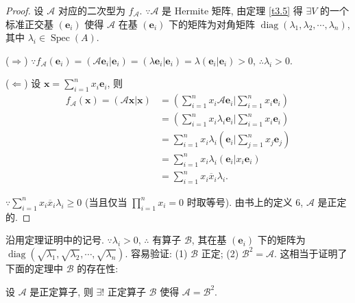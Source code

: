 \documentclass{ctexart}
\begin{document}
\begin{proof}
    设 $\mathcal{A}$ 对应的二次型为 $f_\mathcal{A}$. $\because\mathcal{A}$ 是 Hermite 矩阵, 由定理 \ref{t3.5} 得 $\exists V$ 的一个标准正交基 $(\boldsymbol{e}_i)$ 使得 $\mathcal{A}$ 在基 $(\boldsymbol{e}_i)$ 下的矩阵为对角矩阵 $\operatorname{diag}(\lambda_1,\lambda_2,\cdots,\lambda_n)$, 其中 $\lambda_i\in\operatorname{Spec}(A)$.

    ($\Rightarrow$) $\because f_\mathcal{A}(\boldsymbol{e}_i)=(\mathcal{A}\boldsymbol{e}_i|\boldsymbol{e}_i)=(\lambda\boldsymbol{e}_i|\boldsymbol{e}_i)=\lambda(\boldsymbol{e}_i|\boldsymbol{e}_i)>0$, $\therefore\lambda_i>0$.

    ($\Leftarrow$) 设 $\boldsymbol{x}=\sum\limits_{i=1}^nx_i\boldsymbol{e}_i$, 则
    \begin{align*}
        f_\mathcal{A}(\boldsymbol{x})=(\mathcal{A}\boldsymbol{x}|\boldsymbol{x}) & =\left(\sum\limits_{i=1}^nx_i\mathcal{A}\boldsymbol{e}_i\Bigg|\sum\limits_{i=1}^nx_i\boldsymbol{e}_i\right) \\
        & =\left(\sum\limits_{i=1}^nx_i\lambda_i\boldsymbol{e}_i\Bigg|\sum\limits_{i=1}^nx_i\boldsymbol{e}_i\right) \\
        & =\sum\limits_{i=1}^nx_i\lambda_i\left(\boldsymbol{e}_i\Bigg|\sum\limits_{j=1}^nx_j\boldsymbol{e}_j\right) \\
        & =\sum\limits_{i=1}^nx_i\lambda_i\left(\boldsymbol{e}_i|x_i\boldsymbol{e}_i\right) \\
        & =\sum\limits_{i=1}^nx_i\overline{x}_i\lambda_i.
    \end{align*}

    $\because\sum\limits_{i=1}^nx_i\overline{x}_i\lambda_i\geq0$ (当且仅当 $\prod\limits_{i=1}^nx_i=0$ 时取等号). 由书上的定义 6, $\mathcal{A}$ 是正定的.
\end{proof}
沿用定理证明中的记号. $\because\lambda_i>0$, $\therefore$ 有算子 $\mathcal{B}$, 其在基 $(\boldsymbol{e}_i)$ 下的矩阵为 $\operatorname{diag}(\sqrt{\lambda_1},\sqrt{\lambda_2},\cdots,\sqrt{\lambda_n})$. 容易验证: (1) $\mathcal{B}$ 正定; (2) $\mathcal{B}^2=\mathcal{A}$. 这相当于证明了下面的定理中 $\mathcal{B}$ 的存在性:
\begin{theorem}[书上的命题 1]
    设 $\mathcal{A}$ 是正定算子, 则 $\exists!$ 正定算子 $\mathcal{B}$ 使得 $\mathcal{A}=\mathcal{B}^2$.
\end{theorem}
\end{document}
